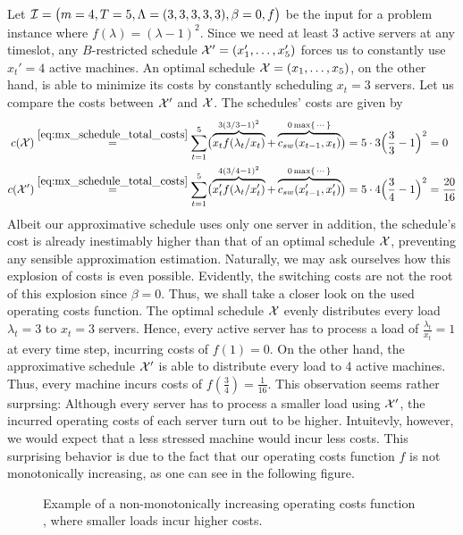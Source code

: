 \begin{exmpl}
Let $\mathcal{I}=\bigl(m=4,T=5,\Lambda=(3,3,3,3,3),\beta=0,f\bigr)$ be the input for a problem instance where $f(\lambda)=(\lambda-1)^2$. Since we need at least 3 active servers at any timeslot, any $B$-restricted schedule $\mathcal{X}'=(x_1',\dotsc,x_5')$ forces us to constantly use $x_t'=4$ active machines. An optimal schedule $\mathcal{X}=(x_1,\dotsc,x_5)$, on the other hand, is able to minimize its costs by constantly scheduling $x_t=3$ servers. Let us compare the costs between $\mathcal{X}'$ and $\mathcal{X}$. The schedules' costs are given by
\begin{align*}
	c(\mathcal{X})&\stackrel{\eqref{eq:mx_schedule_total_costs}}{=}\sum\limits_{t=1}^{5}\bigl(\overbrace{x_tf(\lambda_t/x_t)}^{3(3/3-1)^2}+\overbrace{c_{sw}(x_{t-1},x_t)}^{0\max\{\,\cdots\}}\bigr)=5\cdot3\Bigl(\frac{3}{3}-1\Bigr)^2=0\\
	c(\mathcal{X}')&\stackrel{\eqref{eq:mx_schedule_total_costs}}{=}\sum\limits_{t=1}^{5}\bigl(\overbrace{x_t'f(\lambda_t/x_t')}^{4(3/4-1)^2}+\overbrace{c_{sw}(x_{t-1}',x_t')}^{0\max\{\,\cdots\}}\bigr)=5\cdot4\Bigl(\frac{3}{4}-1\Bigr)^2=\frac{20}{16} 
\end{align*}
Albeit our approximative schedule uses only one server in addition, the schedule's cost is already inestimably higher than that of an optimal schedule $\mathcal{X}$, preventing any sensible approximation estimation. Naturally, we may ask ourselves how this explosion of costs is even possible. Evidently, the switching costs are not the root of this explosion since $\beta=0$. Thus, we shall take a closer look on the used operating costs function. The optimal schedule $\mathcal{X}$ evenly distributes every load $\lambda_t=3$ to $x_t=3$ servers. Hence, every active server has to process a load of $\frac{\lambda_t}{x_t}=1$ at every time step, incurring costs of $f(1)=0$. On the other hand, the approximative schedule $\mathcal{X}'$ is able to distribute every load to 4 active machines. Thus, every machine incurs costs of $f(\frac{3}{4})=\frac{1}{16}$. This observation seems rather surprsing: Although every server has to process a smaller load using $\mathcal{X}'$, the incurred operating costs of each server turn out to be higher. Intuitevly, however, we would expect that a less stressed machine would incur less costs. This surprising behavior is due to the fact that our operating costs function $f$ is not monotonically increasing, as one can see in the following figure.
\begin{figure}[H]
\centering

\caption{Example of a non-monotonically increasing operating costs function , where smaller loads incur higher costs.}
\label{fig:non_mono_incr_f}
\end{figure}
\end{exmpl}
